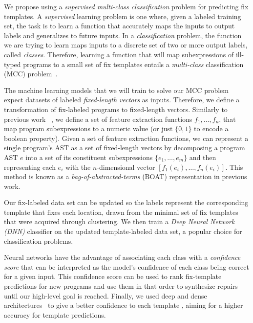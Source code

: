 We propose using a \emph{supervised multi-class classification} problem for
predicting fix templates. A \emph{supervised} learning problem is one
where,
given a labeled training set, the task is to learn a function that accurately
maps the inputs to output labels and generalizes to future inputs. In a
\emph{classification} problem, the function we are trying to learn maps inputs
to a discrete set of two or more output labels, called \emph{classes}.
Therefore, learning a function that will map subexpressions of ill-typed
programs to a small set of fix templates entails a \emph{multi-class}
classification (MCC) problem~\cite{FIXME}.

 The machine learning models that we will train to
solve our MCC problem expect datasets of labeled \emph{fixed-length vectors} as
inputs. Therefore, we define a transformation of fix-labeled programs to
fixed-length vectors. Similarly to previous work ~\citep{Seidel:2017}, we define
a set of feature extraction functions $f_1, \ldots, f_n$, that map program
subexpressions to a numeric value (or just $\{0, 1\}$ to encode a boolean
property). Given a set of feature extraction functions, we can represent a
single program's AST as a set of fixed-length vectors by decomposing a program
AST $e$ into a set of its constituent subexpressions $\{e_1, \ldots, e_m\}$ and
then representing each $e_i$ with the $n$-dimensional vector $[f_1(e_i), \ldots,
f_n(e_i)]$. This method is known as a \emph{bag-of-abstracted-terms} (BOAT)
representation in previous work.

Our fix-labeled data set can be updated so the labels represent the
corresponding template that fixes each location, drawn from the minimal set of
fix templates that were acquired through clustering. We then train a \emph{Deep
Neural Network (DNN)} classifier on the updated template-labeled data set, a
popular choice for classification problems.

Neural networks have the advantage of associating each class with a
\emph{confidence score} that can be interpreted as the model's confidence of
each class being correct for a given input. This confidence score can be
used to rank fix-template predictions for new programs and use them in that
order to synthesize repairs until our high-level goal is reached. Finally, we
used deep and dense architectures~\cite{FIXME} to give a better confidence
to each template
,
aiming for a higher accuracy for template predictions.

